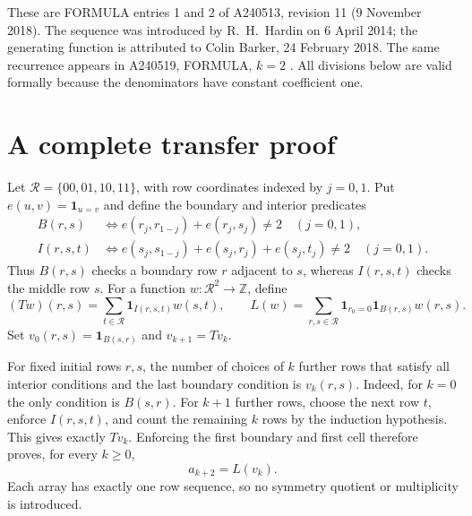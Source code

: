 \documentclass[11pt]{article}
\newcommand{\ind}{\mathbf{1}}
\newcommand{\Z}{\mathbb{Z}}
\begin{document}
These are FORMULA entries 1 and 2 of A240513, revision 11
(9 November 2018). The sequence was introduced by R.\ H.\ Hardin on
6 April 2014; the generating function is attributed to Colin Barker,
24 February 2018. The same recurrence appears in A240519, FORMULA,
$k=2$ \cite{rectangle}. All divisions below are valid formally because
the denominators have constant coefficient one.

\section{A complete transfer proof}
Let $\mathcal R=\{00,01,10,11\}$, with row coordinates indexed by $j=0,1$.
Put $e(u,v)=\ind_{u=v}$ and define the boundary and interior predicates
\begin{align*}
 B(r,s)&\iff e(r_j,r_{1-j})+e(r_j,s_j)\ne2\quad(j=0,1),\\
 I(r,s,t)&\iff e(s_j,s_{1-j})+e(s_j,r_j)+e(s_j,t_j)\ne2
                 \quad(j=0,1).
\end{align*}
Thus $B(r,s)$ checks a boundary row $r$ adjacent to $s$, whereas
$I(r,s,t)$ checks the middle row $s$. For a function
$w:\mathcal R^2\to\Z$, define
\[
 (Tw)(r,s)=\sum_{t\in\mathcal R}\ind_{I(r,s,t)}w(s,t),\qquad
 L(w)=\sum_{r,s\in\mathcal R}\ind_{r_0=0}\ind_{B(r,s)}w(r,s).
\]
Set $v_0(r,s)=\ind_{B(s,r)}$ and $v_{k+1}=Tv_k$.

For fixed initial rows $r,s$, the number of choices of $k$ further rows
that satisfy all interior conditions and the last boundary condition is
$v_k(r,s)$. Indeed, for $k=0$ the only condition is $B(s,r)$.
For $k+1$ further rows, choose the next row $t$, enforce $I(r,s,t)$,
and count the remaining $k$ rows by the induction hypothesis.
This gives exactly $Tv_k$. Enforcing the first boundary and first cell
therefore proves, for every $k\geq0$,
\begin{equation}\label{eq:bridge}
 a_{k+2}=L(v_k).
\end{equation}
Each array has exactly one row sequence, so no symmetry quotient or
multiplicity is introduced.
\end{document}
